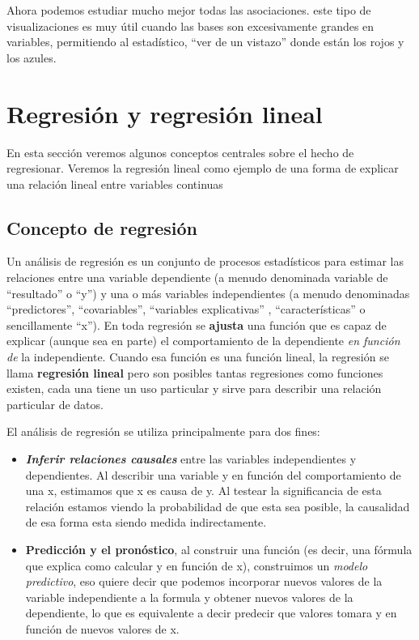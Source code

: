\documentclass[
]{book}
\begin{document}
Ahora podemos estudiar mucho mejor todas las asociaciones. este tipo de visualizaciones es muy útil cuando las bases son excesivamente grandes en variables, permitiendo al estadístico, ``ver de un vistazo'' donde están los rojos y los azules.

\hypertarget{regresiuxf3n-y-regresiuxf3n-lineal}{%
\chapter{Regresión y regresión lineal}\label{regresiuxf3n-y-regresiuxf3n-lineal}}

En esta sección veremos algunos conceptos centrales sobre el hecho de regresionar. Veremos la regresión lineal como ejemplo de una forma de explicar una relación lineal entre variables continuas

\hypertarget{concepto-de-regresiuxf3n}{%
\section{Concepto de regresión}\label{concepto-de-regresiuxf3n}}

Un análisis de regresión es un conjunto de procesos estadísticos para estimar las relaciones entre una variable dependiente (a menudo denominada variable de ``resultado'' o ``y'') y una o más variables independientes (a menudo denominadas ``predictores'', ``covariables'', ``variables explicativas'' , ``características'' o sencillamente ``x''). En toda regresión se \textbf{ajusta} una función que es capaz de explicar (aunque sea en parte) el comportamiento de la dependiente \emph{en función de} la independiente. Cuando esa función es una función lineal, la regresión se llama \textbf{regresión lineal} pero son posibles tantas regresiones como funciones existen, cada una tiene un uso particular y sirve para describir una relación particular de datos.

El análisis de regresión se utiliza principalmente para dos fines:

\begin{itemize}
\item
  \textbf{\emph{Inferir relaciones causales}} entre las variables independientes y dependientes. Al describir una variable y en función del comportamiento de una x, estimamos que x es causa de y. Al testear la significancia de esta relación estamos viendo la probabilidad de que esta sea posible, la causalidad de esa forma esta siendo medida indirectamente.
\item
  \textbf{Predicción y el pronóstico}, al construir una función (es decir, una fórmula que explica como calcular y en función de x), construimos un \emph{modelo predictivo}, eso quiere decir que podemos incorporar nuevos valores de la variable independiente a la formula y obtener nuevos valores de la dependiente, lo que es equivalente a decir predecir que valores tomara y en función de nuevos valores de x.
\end{itemize}
\end{document}
